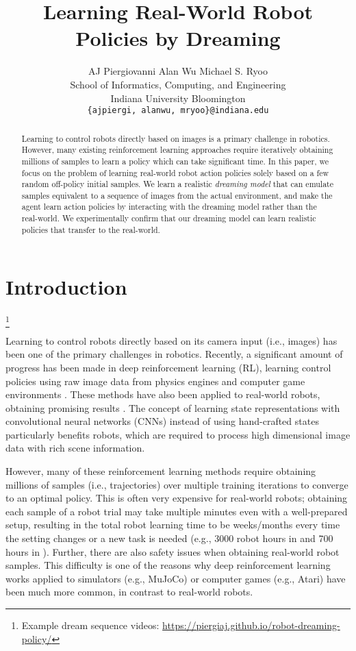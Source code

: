 \documentclass[letterpaper, 10 pt, conference]{ieeeconf}
\title{\LARGE \bf Learning Real-World Robot Policies by Dreaming}
\author{
  AJ Piergiovanni \hspace{1cm} Alan Wu \hspace{1cm} Michael S. Ryoo \\
  School of Informatics, Computing, and Engineering\\
  Indiana University Bloomington\\
  \texttt{\{ajpiergi, alanwu, mryoo\}@indiana.edu} \\
}
\newcommand\blfootnote[1]{%
  \begingroup
  \renewcommand\thefootnote{}\footnote{#1}%
  \addtocounter{footnote}{-1}%
  \endgroup
}
\begin{document}
\maketitle

\begin{abstract}
Learning to control robots directly based on images is a primary challenge in robotics. However, many existing reinforcement learning approaches require iteratively obtaining millions of samples to learn a policy which can take significant time. In this paper, we focus on the problem of learning real-world robot action policies solely based on a few random off-policy initial samples. We learn a realistic \emph{dreaming model} that can emulate samples equivalent to a sequence of images from the actual environment, and make the agent learn action policies by interacting with the dreaming model rather than the real-world. We experimentally confirm that our dreaming model can learn realistic policies that transfer to the real-world.
\end{abstract}


\section{Introduction}
\blfootnote{Example dream sequence videos: \href{https://piergiaj.github.io/robot-dreaming-policy/}{https://piergiaj.github.io/robot-dreaming-policy/}}

Learning to control robots directly based on its camera input (i.e., images) has been one of the primary challenges in robotics. Recently, a significant amount of progress has been made in deep reinforcement learning (RL), learning control policies using raw image data from physics engines and computer game environments \cite{mnih2013playing,heess2015learning}. These methods have also been applied to real-world robots, obtaining promising results \cite{finn2017deep,wahlstrom2015pixels}. The concept of learning state representations with convolutional neural networks (CNNs) instead of using hand-crafted states particularly benefits robots, which are required to process high dimensional image data with rich scene information.








However, many of these reinforcement learning methods require obtaining millions of samples (i.e., trajectories) over multiple training iterations to converge to an optimal policy. 
This is often very expensive for real-world robots; obtaining each sample of a robot trial may take multiple minutes even with a well-prepared setup, resulting in the total robot learning time to be weeks/months every time the setting changes or a new task is needed (e.g., 3000 robot hours in \cite{levine2016learning} and 700 hours in \cite{pinto2016supersizing}). Further, there are also safety issues when obtaining real-world robot samples. This difficulty is one of the reasons why deep reinforcement learning works applied to simulators (e.g., MuJoCo) or computer games (e.g., Atari) have been much more common, in contrast to real-world robots.
\end{document}
